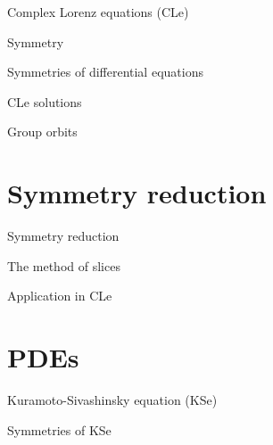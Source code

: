\begin{frame}{Complex Lorenz equations (CLe)}
 \begin{block}{}
  
 \end{block}

 \begin{block}{Symmetry}
  
 \end{block}


\end{frame}

\begin{frame}{Symmetries of differential equations}
 
\end{frame}

\begin{frame}{CLe solutions}
 
\end{frame}

\begin{frame}{Group orbits}
 
\end{frame}

\section{Symmetry reduction}

\begin{frame}{Symmetry reduction}
 
\end{frame}

\begin{frame}{The method of slices}
 
\end{frame}

\begin{frame}{Application in CLe}
 
\end{frame}

\section{PDEs}

\begin{frame}{Kuramoto-Sivashinsky equation (KSe)}
 
\end{frame}

\begin{frame}{Symmetries of KSe}
 
\end{frame}

